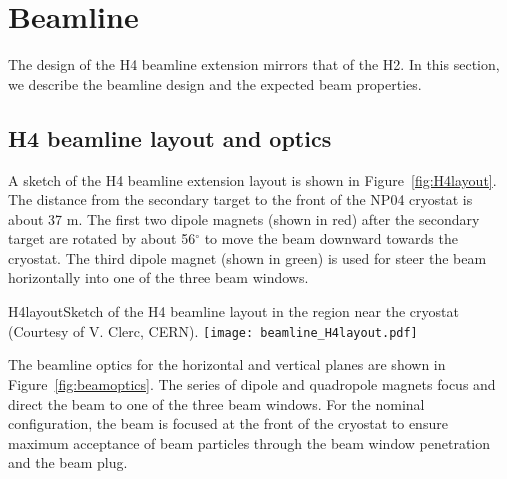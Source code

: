 \section{Beamline}
\label{sec:h4beamline}

The design of the H4 beamline extension mirrors that of the H2. In this section, we describe the beamline design and the expected beam properties.

\subsection{H4 beamline layout and optics}

A sketch of the H4 beamline extension layout is shown in Figure~\ref{fig:H4layout}. The distance from the secondary target to the front of the NP04 cryostat is about 37 m. The first two dipole magnets (shown in red) after the secondary target are rotated by about 56$^\circ$ to move the beam downward towards the cryostat. The third dipole magnet (shown in green) is used for steer the beam horizontally into one of the three beam windows. 

\begin{cdrfigure}{H4layout}{Sketch of the H4 beamline layout in the region near the cryostat (Courtesy of V. Clerc, CERN).}
  \texttt{[image: beamline\_H4layout.pdf]}
\end{cdrfigure}

The beamline optics for the horizontal and vertical planes are shown in Figure~\ref{fig:beamoptics}. The series of dipole and quadropole magnets focus and direct the beam to one of the three beam windows. For the nominal configuration, the beam is focused at the front of the cryostat to ensure maximum acceptance of beam particles through the beam window penetration and the beam plug. 

